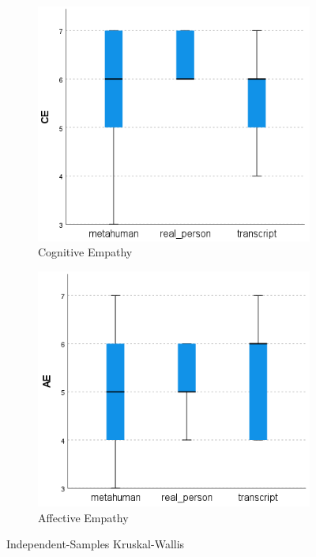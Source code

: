 \begin{figure}[!htb]
    \begin{minipage}{\linewidth}
        \centering
        \begin{subfigure}{0.49\textwidth}
            \centering
            \includegraphics[width=\linewidth]{figures/KW1.png}
            \caption{Cognitive Empathy}
            \label{fig:sub1}
        \end{subfigure}
        \begin{subfigure}{0.49\textwidth}
            \centering
            \includegraphics[width=\linewidth]{figures/KW2.png}
            \caption{Affective Empathy}
            \label{fig:sub2}
        \end{subfigure}
        \caption{Independent-Samples Kruskal-Wallis}
        \label{fig:kwSamples}
	\end{minipage}
\end{figure}

